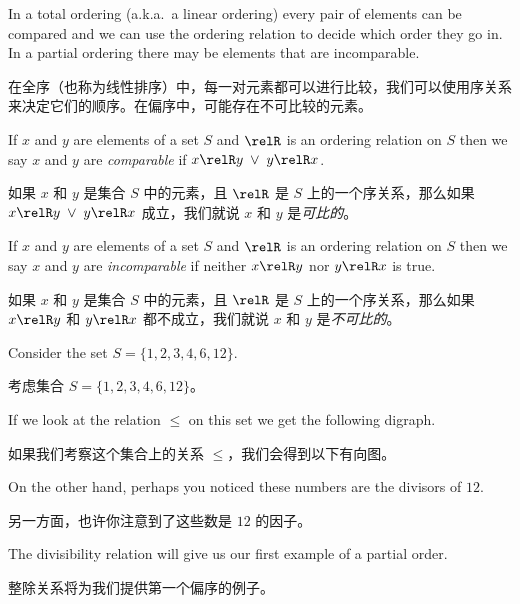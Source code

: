 In a total ordering
(a.k.a.\ a linear ordering) every pair of elements can be compared
and we can use the ordering relation to decide which order they go
in.  In a partial ordering there may be elements that are incomparable.

在全序（也称为线性排序）中，每一对元素都可以进行比较，我们可以使用序关系来决定它们的顺序。在偏序中，可能存在不可比较的元素。

\begin{defi}
If $x$ and $y$ are elements of a set $S$ and $\relR$ is an ordering
relation on $S$ then we say $x$ and $y$ are \emph{comparable} if
$x\relR y \; \lor \; y\relR x$.
\end{defi}

\begin{defi}
如果 $x$ 和 $y$ 是集合 $S$ 中的元素，且 $\relR$ 是 $S$ 上的一个序关系，那么如果 $x\relR y \; \lor \; y\relR x$ 成立，我们就说 $x$ 和 $y$ 是\emph{可比的}。
\end{defi}

\begin{defi}
If $x$ and $y$ are elements of a set $S$ and $\relR$ is an ordering
relation on $S$ then we say $x$ and $y$ are \emph{incomparable} if
neither $x\relR y$ nor $y\relR x$ is true.
\end{defi}

\begin{defi}
如果 $x$ 和 $y$ 是集合 $S$ 中的元素，且 $\relR$ 是 $S$ 上的一个序关系，那么如果 $x\relR y$ 和 $y\relR x$ 都不成立，我们就说 $x$ 和 $y$ 是\emph{不可比的}。
\end{defi}

Consider the set $S = \{1, 2, 3, 4, 6, 12 \}$.

考虑集合 $S = \{1, 2, 3, 4, 6, 12 \}$。

If we look at the
relation $\leq$ on this set we get the following digraph.

如果我们考察这个集合上的关系 $\leq$，我们会得到以下有向图。

\begin{center}

\end{center}

On the other hand, perhaps you noticed these numbers are the 
divisors of $12$.

另一方面，也许你注意到了这些数是 $12$ 的因子。

The divisibility relation will give us our
first example of a partial order.

整除关系将为我们提供第一个偏序的例子。

